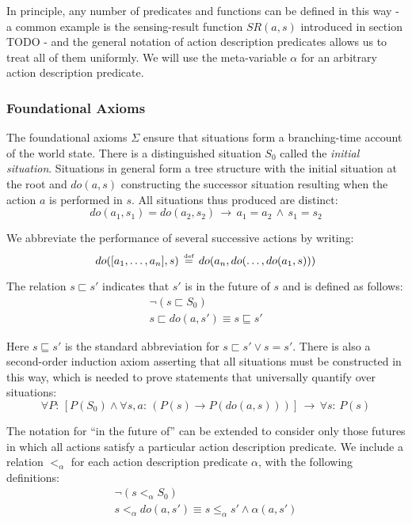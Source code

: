 In principle, any number of predicates and functions can be defined
in this way - a common example is the sensing-result function $SR(a,s)$
introduced in section TODO - and the general notation of action description
predicates allows us to treat all of them uniformly. We will use the
meta-variable $\alpha$ for an arbitrary action description predicate.


\subsubsection{Foundational Axioms}

The foundational axioms $\Sigma$ ensure that situations form a branching-time
account of the world state. There is a distinguished situation $S_{0}$
called the \emph{initial situation}. Situations in general form a
tree structure with the initial situation at the root and $do(a,s)$
constructing the successor situation resulting when the action $a$
is performed in $s$. All situations thus produced are distinct:\[
do(a_{1},s_{1})=do(a_{2},s_{2})\,\rightarrow\, a_{1}=a_{2}\,\wedge\, s_{1}=s_{2}\]


We abbreviate the performance of several successive actions by writing:\[
do([a_{1},\dots,a_{n}],s)\,\stackrel{\mbox{\tiny def}}{=}\, do(a_{n},do(\dots,do(a_{1},s)))\]


The relation $s\sqsubset s'$ indicates that $s'$ is in the future
of $s$ and is defined as follows:\begin{gather*}
\neg(s\sqsubset S_{0})\\
s\sqsubset do(a,s')\equiv s\sqsubseteq s'\end{gather*}


Here $s\sqsubseteq s'$ is the standard abbreviation for $s\sqsubset s'\vee s=s'$.
There is also a second-order induction axiom asserting that all situations
must be constructed in this way, which is needed to prove statements
that universally quantify over situations:\[
\forall P:\,\left[P(S_{0})\wedge\forall s,a:\,\left(P(s)\rightarrow P(do(a,s))\right)\right]\,\rightarrow\,\forall s:\, P(s)\]


The notation for {}``in the future of'' can be extended to consider
only those futures in which all actions satisfy a particular action
description predicate. We include a relation $<_{\alpha}$ for each
action description predicate $\alpha$, with the following definitions:\begin{gather*}
\neg\left(s<_{\alpha}S_{0}\right)\\
s<_{\alpha}do(a,s')\equiv s\leq_{\alpha}s'\wedge\alpha(a,s')\end{gather*}


